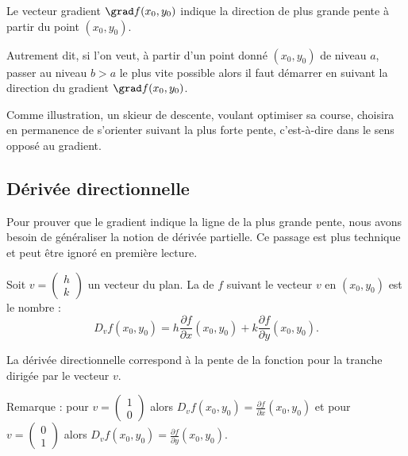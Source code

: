 \begin{proposition}{}{}
	Le vecteur gradient $\grad f(x_0,y_0)$ indique la direction de plus grande pente à partir du point $(x_0,y_0)$.
\end{proposition}


Autrement dit, si l'on veut, à partir d'un point donné $(x_0,y_0)$ de niveau $a$, passer au niveau $b>a$ le plus vite possible alors il faut démarrer en suivant la direction du gradient $\grad f(x_0,y_0)$. 


Comme illustration, un skieur de descente, voulant optimiser sa course, choisira en permanence de s'orienter suivant la plus forte pente, c'est-à-dire dans le sens opposé au gradient. 

\subsection{Dérivée directionnelle}

Pour prouver que le gradient indique la ligne de la plus grande pente, nous avons besoin de généraliser la notion de dérivée partielle. Ce passage est plus technique et peut être ignoré en première lecture.

Soit $v=\left(\begin{smallmatrix}h\\k\end{smallmatrix}\right)$ un vecteur du plan.
La  de $f$ suivant le vecteur $v$ en $(x_0,y_0)$ est le nombre :
$$D_v f(x_0,y_0) = h\frac{\partial f}{\partial x}(x_0,y_0)
+k\frac{\partial f}{\partial y}(x_0,y_0).$$


La dérivée directionnelle correspond à la pente de la fonction pour la tranche dirigée par le vecteur $v$.


Remarque : pour $v=\left(\begin{smallmatrix}1\\0\end{smallmatrix}\right)$
alors $D_v f(x_0,y_0) = \frac{\partial f}{\partial x}(x_0,y_0)$ et pour 
$v=\left(\begin{smallmatrix}0\\1\end{smallmatrix}\right)$
alors $D_v f(x_0,y_0) = \frac{\partial f}{\partial y}(x_0,y_0)$.


